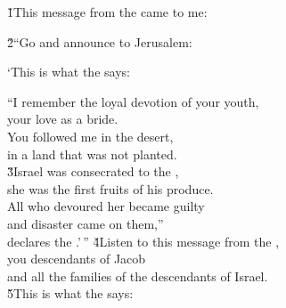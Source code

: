 \v{1}This message from the  came to me:

\begin{poetry}
\poeml \v{2}``Go and announce to Jerusalem:
\end{poetry}

\begin{poetry}
\poeml `This is what the  says:
\end{poetry}

\begin{poetry}
\poeml ``I remember the loyal devotion of your youth, \\
\poemll    your love as a bride. \\
\poeml You followed me in the desert, \\
\poemll    in a land that was not planted. \\
\poeml \v{3}Israel was consecrated to the , \\
\poemll    she was the first fruits of his produce. \\
\poeml All who devoured her became guilty \\
\poemll    and disaster came on them,'' \\
\poemlll       declares the .'\,''
\poeml \v{4}Listen to this message from the , \\
\poemll    you descendants of Jacob \\
\poemlll       and all the families of the descendants of Israel. \\
\poeml \v{5}This is what the  says:
\end{poetry}

